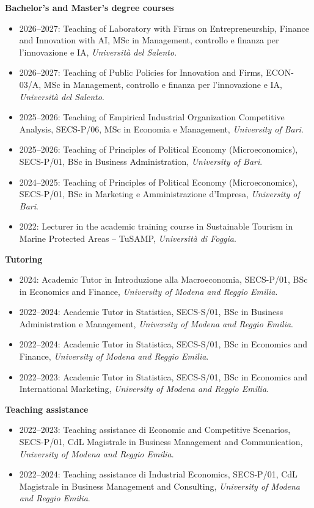 \documentclass[11pt,a4paper,sans]{moderncv} %
\begin{document}
\textbf{Bachelor's and Master's degree courses}
\begin{itemize}

\item 2026--2027: Teaching of Laboratory with Firms on Entrepreneurship, Finance and Innovation with AI, MSc in Management, controllo e finanza per l’innovazione e IA, \textit{Università del Salento}.

\item 2026--2027: Teaching of Public Policies for Innovation and Firms, ECON-03/A, MSc in Management, controllo e finanza per l’innovazione e IA, \textit{Università del Salento}.

  \item 2025--2026: Teaching of Empirical Industrial Organization Competitive Analysis, SECS-P/06, MSc in Economia e Management, \textit{University of Bari}.
  \item 2025--2026: Teaching of Principles of Political Economy (Microeconomics), SECS-P/01, BSc in Business Administration, \textit{University of Bari}.
  \item 2024--2025: Teaching of Principles of Political Economy (Microeconomics), SECS-P/01, BSc in Marketing e Amministrazione d'Impresa, \textit{University of Bari}.
  \item 2022: Lecturer in the academic training course in Sustainable Tourism in Marine Protected Areas – TuSAMP, \textit{Università di Foggia}.
\end{itemize}
\textbf{Tutoring}
\begin{itemize}
  \item 2024: Academic Tutor in Introduzione alla Macroeconomia, SECS-P/01, BSc in Economics and Finance, 
  \textit{University of Modena and Reggio Emilia}.
  \item 2022--2024: Academic Tutor in Statistica, SECS-S/01, BSc in Business Administration e Management, \textit{University of Modena and Reggio Emilia}.
  \item 2022--2024: Academic Tutor in Statistica, SECS-S/01, BSc in Economics and Finance, \textit{University of Modena and Reggio Emilia}.
  \item 2022--2023: Academic Tutor in Statistica, SECS-S/01, BSc in Economics and International Marketing, \textit{University of Modena and Reggio Emilia}.
\end{itemize}

\textbf{Teaching assistance}
\begin{itemize}
  \item 2022--2023: Teaching assistance di Economic and Competitive Scenarios, SECS-P/01, CdL Magistrale in Business Management and Communication, \textit{University of Modena and Reggio Emilia}.
  \item 2022--2024: Teaching assistance di Industrial Economics, SECS-P/01, CdL Magistrale in Business Management and Consulting, \textit{University of Modena and Reggio Emilia}.
\end{itemize}
\end{document}
